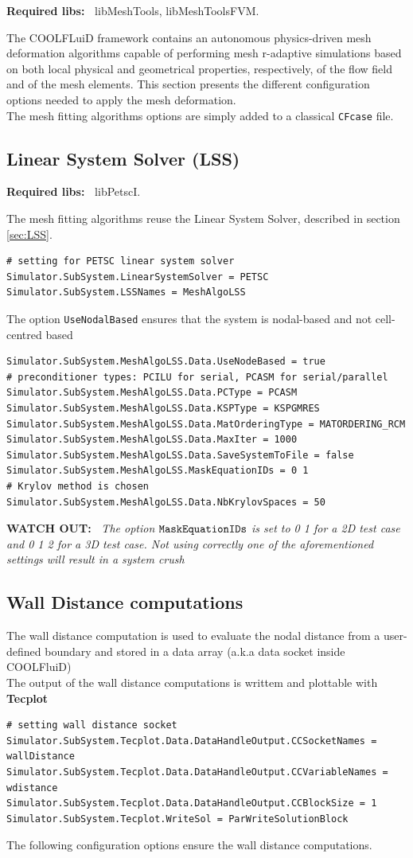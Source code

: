 \documentclass[11pt]{article}
\begin{document}
{\bf Required libs:~} libMeshTools, libMeshToolsFVM.

The COOLFLuiD framework contains an autonomous physics-driven mesh deformation algorithms capable of performing mesh r-adaptive simulations based on both local physical and geometrical properties, respectively, of the flow field and of the mesh elements. This section presents the different configuration options needed to apply the mesh deformation.\\
The mesh fitting algorithms options are simply added to a classical {\tt CFcase} file.

\subsection{Linear System Solver (LSS)}
{\bf Required libs:~} libPetscI.

The mesh fitting algorithms reuse the Linear System Solver, described in section \ref{sec:LSS}. 

\begin{verbatim}
# setting for PETSC linear system solver
Simulator.SubSystem.LinearSystemSolver = PETSC
Simulator.SubSystem.LSSNames = MeshAlgoLSS
\end{verbatim}
The option {\tt UseNodalBased} ensures that the system is nodal-based and not cell-centred based
\begin{verbatim}
Simulator.SubSystem.MeshAlgoLSS.Data.UseNodeBased = true
# preconditioner types: PCILU for serial, PCASM for serial/parallel
Simulator.SubSystem.MeshAlgoLSS.Data.PCType = PCASM
Simulator.SubSystem.MeshAlgoLSS.Data.KSPType = KSPGMRES
Simulator.SubSystem.MeshAlgoLSS.Data.MatOrderingType = MATORDERING_RCM
Simulator.SubSystem.MeshAlgoLSS.Data.MaxIter = 1000
Simulator.SubSystem.MeshAlgoLSS.Data.SaveSystemToFile = false
Simulator.SubSystem.MeshAlgoLSS.MaskEquationIDs = 0 1
# Krylov method is chosen 
Simulator.SubSystem.MeshAlgoLSS.Data.NbKrylovSpaces = 50
\end{verbatim}

{\bf WATCH OUT:~} {\it The option $\tt{MaskEquationIDs}$ is set to 0 1 for a 2D test case and 0 1 2 for a 3D test case. Not using correctly one of the aforementioned settings will result in a system crush}


\subsection{Wall Distance computations}
The wall distance computation is used to evaluate the nodal distance from a user-defined boundary and stored in a data array (a.k.a data socket inside COOLFluiD)\\ 
The output of the wall distance computations is writtem and plottable with \textbf{Tecplot}
\begin{verbatim}
# setting wall distance socket
Simulator.SubSystem.Tecplot.Data.DataHandleOutput.CCSocketNames = wallDistance
Simulator.SubSystem.Tecplot.Data.DataHandleOutput.CCVariableNames = wdistance
Simulator.SubSystem.Tecplot.Data.DataHandleOutput.CCBlockSize = 1
Simulator.SubSystem.Tecplot.WriteSol = ParWriteSolutionBlock
\end{verbatim}
The following configuration options ensure the wall distance computations.
\end{document}
